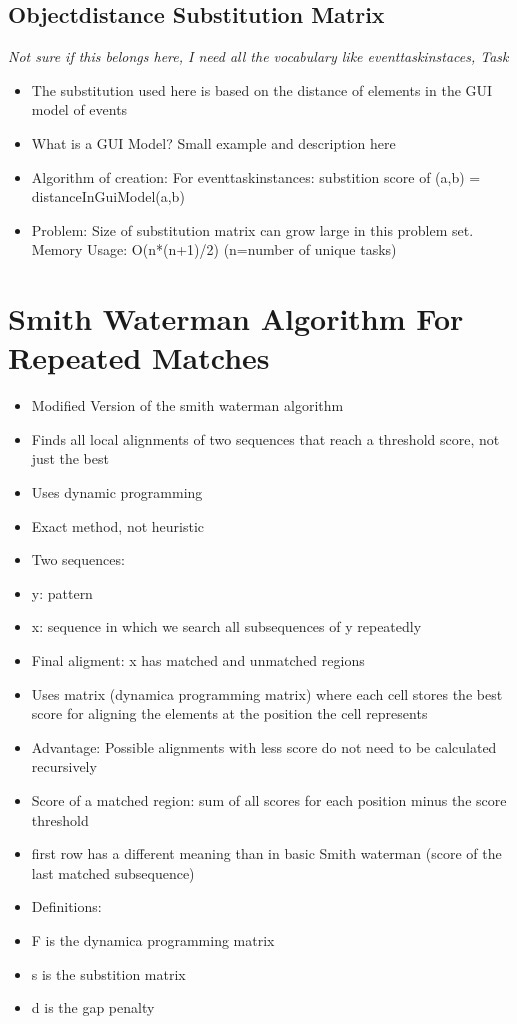 \subsection{Objectdistance Substitution Matrix}
\textit{Not sure if this belongs here, I need all the vocabulary  like eventtaskinstaces, Task}
\begin{itemize}
	\item The substitution used here is based on the distance of elements in the GUI model of events
	\item What is a GUI Model? Small example and description here
	\item Algorithm of creation: For eventtaskinstances:  substition score of (a,b) = distanceInGuiModel(a,b) 
	\item Problem: Size of substitution matrix can grow large in this problem set. Memory Usage: O(n*(n+1)/2) (n=number of unique tasks)

\end{itemize}

\section{Smith Waterman Algorithm For Repeated Matches}
\begin{itemize}
	\item Modified Version of the smith waterman algorithm
	\item Finds all local alignments of two sequences that reach a threshold score, not just the best
	\item Uses dynamic programming
	\item Exact method, not heuristic
	\item Two sequences: 
	\item y: pattern
	\item x: sequence in which we search all subsequences of y repeatedly
	\item Final aligment: x has matched and unmatched regions
	\item Uses matrix (dynamica programming matrix) where each cell stores the best score for aligning the elements at the position the cell represents
	\item Advantage: Possible alignments with less score do not need to be calculated recursively
	\item Score of a matched region: sum of all scores for each position minus the score threshold 
	\item first row has a different meaning than in basic Smith waterman (score of the last matched subsequence)
	\item Definitions:
	\item F is the dynamica programming matrix
	\item s is the substition matrix
	\item d is the gap penalty
\end{itemize}

